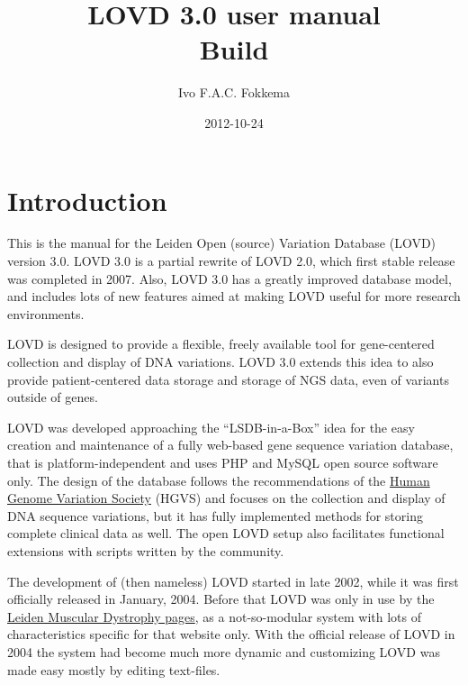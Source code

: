 \documentclass[a4paper,oneside,openany,12pt]{memoir}
\title{LOVD 3.0 user manual \\\vskip 1cm Build \LOVDversion}
\author{Ivo F.A.C. Fokkema}
\institute{Leiden University Medical Center}
\date{2012-10-24} %
\begin{document}
\begin{titlingpage} %
\maketitle
\end{titlingpage}





\hypertarget{toc}{}
\tableofcontents





\chapter{Introduction}

This is the manual for the Leiden Open (source) Variation Database (LOVD) version 3.0.
LOVD 3.0 is a partial rewrite of LOVD 2.0, which first stable release was completed in 2007.
Also, LOVD 3.0 has a greatly improved database model, and includes lots of new features aimed at making LOVD useful for more research environments.
\par
LOVD is designed to provide a flexible, freely available tool for gene-centered collection and display of DNA variations.
LOVD 3.0 extends this idea to also provide patient-centered data storage and storage of NGS data, even of variants outside of genes.
\\
\par
LOVD was developed approaching the ``LSDB-in-a-Box'' idea for the easy creation and maintenance of a fully web-based gene sequence variation database,
that is platform-independent and uses PHP and MySQL open source software only.
The design of the database follows the recommendations of the \href{http://www.hgvs.org/}{Human Genome Variation Society} (HGVS)
and focuses on the collection and display of DNA sequence variations, but it has fully implemented methods for storing complete clinical data as well.
The open LOVD setup also facilitates functional extensions with scripts written by the community.
\\
\par
The development of (then nameless) LOVD started in late 2002, while it was first officially released in January, 2004.
Before that LOVD was only in use by the \href{http://www.DMD.nl/}{Leiden Muscular Dystrophy pages},
as a not-so-modular system with lots of characteristics specific for that website only.
With the official release of LOVD in 2004 the system had become much more dynamic and customizing LOVD was made easy mostly by editing text-files.
\end{document}
